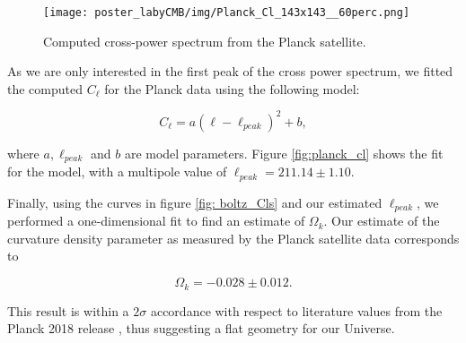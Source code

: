 \begin{figure}
	\begin{minipage}{0.95\textwidth}
		\centering\texttt{[image: poster\_labyCMB/img/Planck\_Cl\_143x143\_\_60perc.png]}
		\caption{Computed cross-power spectrum from the Planck satellite.}
		\label{fig:planck_cls}
	\end{minipage}
\end{figure}

As we are only interested in the first peak of the cross power spectrum, we fitted the computed $C_{\ell}$ for the Planck data using the following model:

\begin{equation}
    C_{\ell} = a(\ell-\ell_{peak})^2 + b,
\end{equation}

where $a, \ell_{peak}$ and $b$ are model parameters. Figure \ref{fig:planck_cl} shows the fit for the model, with a multipole value of $\ell_{peak} = 211.14 \pm 1.10$.

Finally, using the curves in figure \ref{fig: boltz_Cls} and our estimated $\ell_{peak}$, we performed a one-dimensional fit to find an estimate of $\Omega_k$. Our estimate of the curvature density parameter as measured by the Planck satellite data corresponds to 

\begin{equation*}
    \Omega_k = -0.028 \pm 0.012.
\end{equation*}

This result is within a $2\sigma$ accordance with respect to literature values from the Planck 2018 release \cite{planck:2018_main}, thus suggesting a flat geometry for our Universe. 

	
